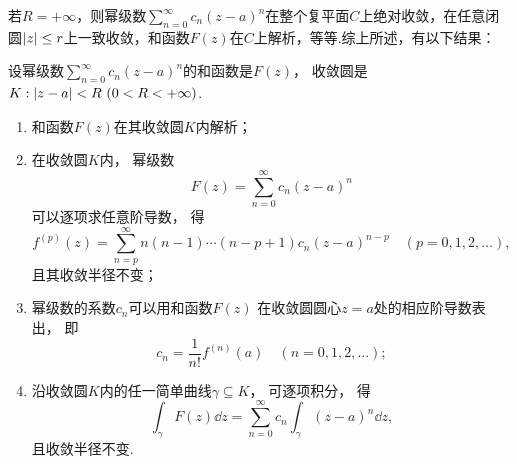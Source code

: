 若\(R=+\infty\)，则幂级数\(\sum_{n=0}^\infty c_n (z-a)^n\)在整个复平面\(C\)上绝对收敛，在任意闭圆\(\abs{z} \leq r\)上一致收敛，和函数\(F(z)\)在\(C\)上解析，等等.综上所述，有以下结果：
\begin{theorem}\label{theorem:解析函数的级数表示.幂级数的和函数的性质}
设幂级数\(\sum_{n=0}^\infty c_n (z-a)^n\)的和函数是\(F(z)\)，
收敛圆是\(K: \abs{z-a}<R\ (0<R<+\infty)\).
\begin{enumerate}
	\item 和函数\(F(z)\)在其收敛圆\(K\)内解析；

	\item 在收敛圆\(K\)内，
	幂级数\[
		F(z) = \sum_{n=0}^\infty c_n (z-a)^n
	\]
	可以逐项求任意阶导数，
	得\begin{equation}
		f^{(p)}(z) = \sum_{n=p}^\infty n(n-1)\dotsm(n-p+1) c_n (z-a)^{n-p}
		\quad(p=0,1,2,\dotsc),
	\end{equation}
	且其收敛半径不变；

	\item 幂级数的系数\(c_n\)可以用和函数\(F(z)\)
	在收敛圆圆心\(z=a\)处的相应阶导数表出，
	即\begin{equation}
		c_n = \frac{1}{n!} f^{(n)}(a)
		\quad(n=0,1,2,\dotsc);
	\end{equation}

	\item 沿收敛圆\(K\)内的任一简单曲线\(\gamma \subseteq K\)，
	可逐项积分，
	得\begin{equation}
		\int_\gamma F(z) \dd{z}
		= \sum_{n=0}^\infty c_n \int_\gamma (z-a)^n \dd{z},
	\end{equation}
	且收敛半径不变.
\end{enumerate}
\end{theorem}

